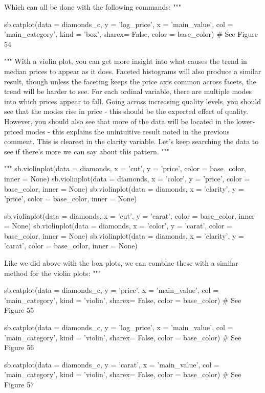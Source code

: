 \begin{python}
	Which can all be done with the following commands:
	"""
	
	
	sb.catplot(data = diamonds_c, y = 'log_price', x = 'main_value', col = 'main_category', kind = 'box', sharex= False, color = base_color)
	# See Figure 54
	
	"""
	With a violin plot, you can get more insight into what causes the trend in median prices to appear as it does. Faceted histograms will also produce a similar result, though unless the faceting keeps the price axis common across facets, the trend will be harder to see. For each ordinal variable, there are multiple modes into which prices appear to fall. Going across increasing quality levels, you should see that the modes rise in price - this should be the expected effect of quality. However, you should also see that more of the data will be located in the lower-priced modes - this explains the unintuitive result noted in the previous comment. This is clearest in the clarity variable. Let's keep searching the data to see if there's more we can say about this pattern.
	"""
	
	"""
	sb.violinplot(data = diamonds, x = 'cut', y = 'price', color = base_color, inner = None)
	sb.violinplot(data = diamonds, x = 'color', y = 'price', color = base_color, inner = None)
	sb.violinplot(data = diamonds, x = 'clarity', y = 'price', color = base_color, inner = None)
	
	sb.violinplot(data = diamonds, x = 'cut', y = 'carat', color = base_color, inner = None)
	sb.violinplot(data = diamonds, x = 'color', y = 'carat', color = base_color, inner = None)
	sb.violinplot(data = diamonds, x = 'clarity', y = 'carat', color = base_color, inner = None)
	
	Like we did above with the box plots, we can combine these with a similar method for the violin plots: 
	"""
	
	sb.catplot(data = diamonds_c, y = 'price', x = 'main_value', col = 'main_category', kind = 'violin', sharex= False, color = base_color)
	# See Figure 55
	
	sb.catplot(data = diamonds_c, y = 'log_price', x = 'main_value', col = 'main_category', kind = 'violin', sharex= False, color = base_color)
	# See Figure 56
	
	sb.catplot(data = diamonds_c, y = 'carat', x = 'main_value', col = 'main_category', kind = 'violin', sharex= False, color = base_color)
	# See Figure 57
\end{python}

